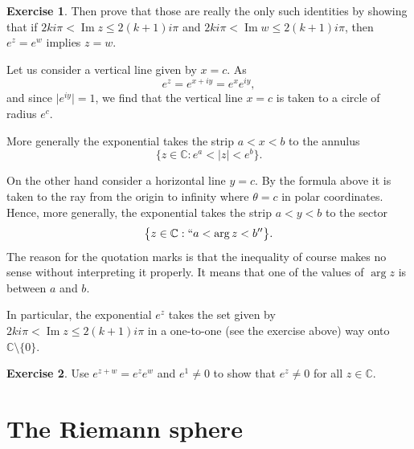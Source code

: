 \documentclass[12pt,openany]{book}
\renewcommand{\Im}{\operatorname{Im}}
\newcommand{\sabs}[1]{\lvert {#1} \rvert}
\newcommand{\C}{{\mathbb{C}}}
\theoremstyle{plain}
\theoremstyle{remark}
\theoremstyle{definition}
\newenvironment{exbox}{%
    \def\FrameCommand{\vrule width 1pt \relax\hspace {10pt}}%
    \MakeFramed {\advance \hsize -\width \FrameRestore }%
}{%
    \endMakeFramed
}
\theoremstyle{exercise}
\newtheorem{exercise}{Exercise}[section]
\theoremstyle{example}
\begin{document}
\begin{exbox}
\begin{exercise}
Then prove that those are really the only such identities by
showing that if $2ki\pi < \Im z \leq 2(k+1)i\pi$ and
$2ki\pi < \Im w \leq 2(k+1)i\pi$, then $e^z=e^w$ implies $z=w$.
\end{exercise}
\end{exbox}

Let us consider a vertical line given by $x=c$.  As
\begin{equation*}
e^{z} = 
e^{x+iy} =
e^x e^{iy} ,
\end{equation*}
and since $\sabs{e^{iy}} =1$, we find that the vertical line $x=c$ is taken to a
circle of radius $e^c$.

More generally the exponential takes the strip $a < x < b$ to the
annulus
\begin{equation*}
\bigl\{ z \in \C : e^a < \sabs{z} < e^b \bigr\} .
\end{equation*}

On the other hand consider a horizontal line $y=c$.  By the formula above it
is taken to the ray from the origin to infinity where $\theta = c$ in polar
coordinates.  Hence, more generally,
the exponential takes the strip $a < y < b$ to the
sector
\begin{equation*}
\bigl\{ z \in \C : ``a < \arg z < b'' \bigr\} .
\end{equation*}
The reason for the quotation marks is that the inequality of course makes no
sense without interpreting it properly.  It means that one of the values
of $\arg z$ is between $a$ and $b$.

In particular, the exponential $e^z$ takes the set given by
$2ki\pi < \Im z \leq 2(k+1)i\pi$ in a one-to-one (see the exercise above)
way onto $\C \setminus \{ 0 \}$.

\begin{exbox}
\begin{exercise}
Use $e^{z+w} = e^z e^w$ and $e^1 \not= 0$ to show that $e^z \not=0$ for all
$z \in \C$.
\end{exercise}
\end{exbox}


\section{The Riemann sphere}
\end{document}
